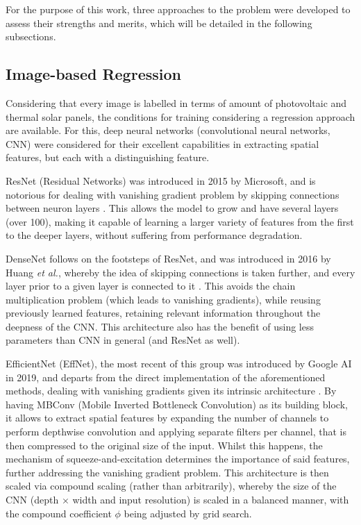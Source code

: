 \documentclass[conference]{IEEEtran}
\begin{document}
For the purpose of this work, three approaches to the problem were developed to assess their strengths and merits, which will be detailed in the following subsections.

\subsection{Image-based Regression}

Considering that every image is labelled in terms of amount of photovoltaic and thermal solar panels, the conditions for training considering a regression approach are available. For this, deep neural networks (convolutional neural networks, CNN) were considered for their excellent capabilities in extracting spatial features, but each with a distinguishing feature.

ResNet (Residual Networks) was introduced in 2015 by Microsoft, and is notorious for dealing with vanishing gradient problem by skipping connections between neuron layers \cite{ResNet}. This allows the model to grow and have several layers (over 100), making it capable of learning a larger variety of features from the first to the deeper layers, without suffering from performance degradation.

DenseNet follows on the footsteps of ResNet, and was introduced in 2016 by Huang \textit{et al.}, whereby the idea of skipping connections is taken further, and every layer prior to a given layer is connected to it \cite{DenseNet}. This avoids the chain multiplication problem (which leads to vanishing gradients), while reusing previously learned features, retaining relevant information throughout the deepness of the CNN. This architecture also has the benefit of using less parameters than CNN in general (and ResNet as well).

EfficientNet (EffNet), the most recent of this group was introduced by Google AI in 2019, and departs from the direct implementation of the aforementioned methods, dealing with vanishing gradients given its intrinsic architecture \cite{EffienctNet}. By having MBConv (Mobile Inverted Bottleneck Convolution) as its building block, it allows to extract spatial features by expanding the number of channels to perform depthwise convolution and applying separate filters per channel, that is then compressed to the original size of the input. Whilst this happens, the mechanism of squeeze-and-excitation determines the importance of said features, further addressing the vanishing gradient problem. This architecture is then scaled via compound scaling (rather than arbitrarily), whereby the size of the CNN (depth $\times$ width and input resolution) is scaled in a balanced manner, with the compound coefficient $\phi$ being adjusted by grid search.
\end{document}
